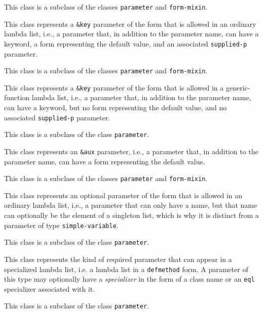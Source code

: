 This class is a subclass of the classes
\texttt{parameter} and \texttt{form-mixin}.


This class represents a \texttt{\&key} parameter of the form that is
allowed in an ordinary lambda list, i.e., a parameter that, in
addition to the parameter name, can have a keyword, a form
representing the default value, and an associated \texttt{supplied-p}
parameter.

This class is a subclass of the classes
\texttt{parameter} and \texttt{form-mixin}.


This class represents a \texttt{\&key} parameter of the form that is
allowed in a generic-function lambda list, i.e., a parameter that, in
addition to the parameter name, can have a keyword, but no form
representing the default value, and no associated \texttt{supplied-p}
parameter.

This class is a subclass of the class \texttt{parameter}.


This class represents an \texttt{\&aux} parameter, i.e., a parameter
that, in addition to the parameter name, can have a form representing
the default value.

This class is a subclass of the classes
\texttt{parameter} and \texttt{form-mixin}.


This class represents an optional parameter of the form that is
allowed in an ordinary lambda list, i.e., a parameter that can only
have a name, but that name can optionally be the element of a
singleton list, which is why it is distinct from a parameter of type
\texttt{simple-variable}.

This class is a subclass of the class \texttt{parameter}.


This class represents the kind of required parameter that can appear
in a specialized lambda list, i.e. a lambda list in a
\texttt{defmethod} form.  A parameter of this type may optionally have
a \emph{specializer} in the form of a class name or an \texttt{eql}
specializer associated with it.

This class is a subclass of the class \texttt{parameter}.


